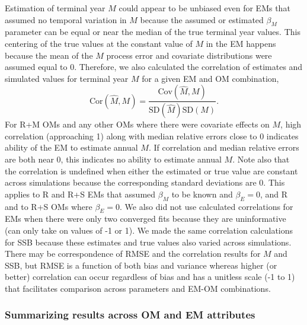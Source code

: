 \documentclass[
  12pt,
]{article}
\begin{document}
Estimation of terminal year \(M\) could appear to be unbiased even for
EMs that assumed no temporal variation in \(M\) because the assumed or
estimated \(\beta_M\) parameter can be equal or near the median of the
true terminal year values. This centering of the true values at the
constant value of \(M\) in the EM happens because the mean of the \(M\)
process error and covariate distributions were assumed equal to 0.
Therefore, we also calculated the correlation of estimates and simulated
values for terminal year \(M\) for a given EM and OM combination, \[
\text{Cor}\left(\widehat M, M\right) = \frac{\text{Cov}\left(\widehat M, M\right)}{\text{SD}\left(\widehat M\right)\text{SD}\left(M\right)}.
\] For R+M OMs and any other OMs where there were covariate effects on
\(M\), high correlation (approaching 1) along with median relative
errors close to 0 indicates ability of the EM to estimate annual \(M\).
If correlation and median relative errors are both near 0, this
indicates no ability to estimate annual \(M\). Note also that the
correlation is undefined when either the estimated or true value are
constant across simulations because the corresponding standard
deviations are 0. This applies to R and R+S EMs that assumed \(\beta_M\)
to be known and \(\beta_E = 0\), and R and to R+S OMs where
\(\beta_E = 0\). We also did not use calculated correlations for EMs
when there were only two converged fits because they are uninformative
(can only take on values of -1 or 1). We made the same correlation
calculations for SSB because these estimates and true values also varied
across simulations. There may be correspondence of RMSE and the
correlation results for \(M\) and SSB, but RMSE is a function of both
bias and variance whereas higher (or better) correlation can occur
regardless of bias and has a unitless scale (-1 to 1) that facilitates
comparison across parameters and EM-OM combinations.

\subsubsection*{Summarizing results across OM and EM
attributes}\label{summarizing-results-across-om-and-em-attributes}
\end{document}
